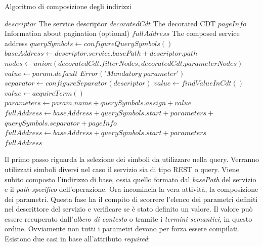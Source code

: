 \begin{algorithm}
	\caption{Algoritmo di composizione degli indirizzi}
	\label{alg:algoritmo-composizione-indirizzi}
	\begin{algorithmic}
		\Require
			\Statex $ descriptor $ \Comment The service descriptor
			\Statex $ decoratedCdt $ \Comment The decorated CDT
			\Statex $ pageInfo $ \Comment Information about pagination  (optional)
		\Ensure
			\Statex $ fullAddress $ \Comment The composed service address
		\Statex
		\State $ querySymbols \gets configureQuerySymbols() $
		\State $ baseAddress \gets descriptor.service.basePath + descriptor.path $
		\State $ nodes \gets union(decoratedCdt.filterNodes, decoratedCdt.parameterNodes) $
					\State $ value \gets  param.default  $
				\Else
						\State $ Error('Mandatory\; parameter') $
					\EndIf
				\EndIf
			\Else
				\State $ separator \gets configureSeparator(descriptor) $
					\State $ value \gets findValueInCdt() $
				\Else
					\State $ value \gets acquireTerm() $
				\EndIf
			\EndIf
			\State $ parameters \gets param.name + querySymbols.assign + value  $
		\EndFor
			\State $ fullAddress \gets baseAddress + querySymbols.start + parameters +$
			\State\hspace{\algorithmicindent} $ querySymbols.separator + pageInfo $
		\Else
			\State $ fullAddress \gets baseAddress + querySymbols.start + parameters$
		\EndIf\\
		\Return $ fullAddress $
	\end{algorithmic}
\end{algorithm}

Il primo passo riguarda la selezione dei simboli da utilizzare nella query. Verranno utilizzati simboli diversi nel caso il servizio sia di tipo REST o query. Viene subito composto l'indirizzo di base, ossia quello formato dal \emph{basePath} del servizio e il \emph{path specifico} dell'operazione. Ora incomincia la vera attività, la composizione dei parametri. Questa fase ha il compito di scorrere l'elenco dei parametri definiti nel descrittore del servizio e verificare se è stato definito un valore. Il valore può essere recuperato dall'\emph{albero di contesto} o tramite i \emph{termini semantici}, in questo ordine. Ovviamente non tutti i parametri devono per forza essere compilati. Esistono due casi in base all'attributo \emph{required}:

